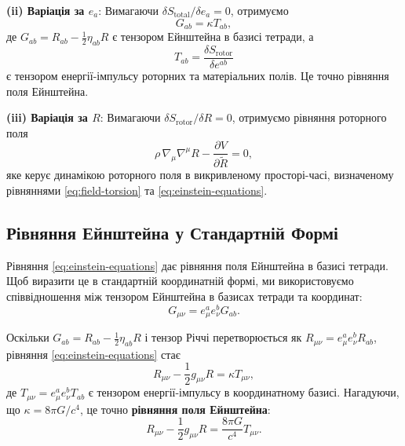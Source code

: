 \documentclass[11pt,a4paper]{article}
\numberwithin{equation}{section}
\theoremstyle{plain}
\theoremstyle{definition}
\theoremstyle{remark}
\begin{document}
\textbf{(ii) Варіація за $e_a$}: Вимагаючи $\delta S_{\mathrm{total}}/\delta e_a = 0$, отримуємо
\begin{equation}
G_{ab} = \kappa T_{ab},
\label{eq:einstein-equations}
\end{equation}
де $G_{ab} = R_{ab} - \frac{1}{2}\eta_{ab}R$ є тензором Ейнштейна в базисі тетради, а
\begin{equation}
T_{ab} = \frac{\delta S_{\mathrm{rotor}}}{\delta e^{ab}}
\end{equation}
є тензором енергії-імпульсу роторних та матеріальних полів. Це точно рівняння поля Ейнштейна.

\textbf{(iii) Варіація за $R$}: Вимагаючи $\delta S_{\mathrm{rotor}}/\delta R = 0$, отримуємо рівняння роторного поля
\begin{equation}
\rho\, \nabla_\mu \nabla^\mu R - \frac{\partial V}{\partial \widetilde{R}} = 0,
\label{eq:rotor-dynamics}
\end{equation}
яке керує динамікою роторного поля в викривленому просторі-часі, визначеному рівняннями \eqref{eq:field-torsion} та \eqref{eq:einstein-equations}.

\subsection{Рівняння Ейнштейна у Стандартній Формі}

Рівняння \eqref{eq:einstein-equations} дає рівняння поля Ейнштейна в базисі тетради. Щоб виразити це в стандартній координатній формі, ми використовуємо співвідношення між тензором Ейнштейна в базисах тетради та координат:
\begin{equation}
G_{\mu\nu} = e_\mu^a e_\nu^b G_{ab}.
\end{equation}

Оскільки $G_{ab} = R_{ab} - \frac{1}{2}\eta_{ab}R$ і тензор Річчі перетворюється як $R_{\mu\nu} = e_\mu^a e_\nu^b R_{ab}$, рівняння \eqref{eq:einstein-equations} стає
\begin{equation}
R_{\mu\nu} - \frac{1}{2}g_{\mu\nu}R = \kappa T_{\mu\nu},
\label{eq:einstein-standard}
\end{equation}
де $T_{\mu\nu} = e_\mu^a e_\nu^b T_{ab}$ є тензором енергії-імпульсу в координатному базисі. Нагадуючи, що $\kappa = 8\pi G/c^4$, це точно \textbf{рівняння поля Ейнштейна}:
\begin{equation}
R_{\mu\nu} - \frac{1}{2}g_{\mu\nu}R = \frac{8\pi G}{c^4} T_{\mu\nu}.
\label{eq:einstein-final}
\end{equation}
\end{document}
